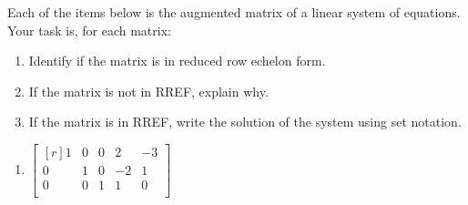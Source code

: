 \documentclass[12pt]{article}
\begin{document}
Each of the items below is the augmented matrix of a linear system of equations. Your task is, for each matrix:
\begin{enumerate}
\item Identify if the matrix is in reduced row echelon form.
\item If the matrix is not in RREF, explain why.
\item If the matrix is in RREF, write the solution of the system using set notation.
\end{enumerate}

\begin{enumerate}
\item
$\begin{bmatrix*}[r]
1 & 0 & 0 &  2 & -3\\
0 & 1 & 0 & -2 & 1\\
0 & 0 & 1 &  1 & 0\\
\end{bmatrix*}$


\end{enumerate}
\end{document}
